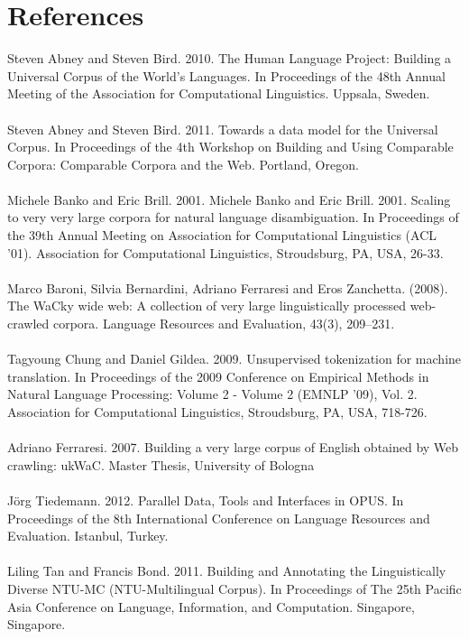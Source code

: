 \documentclass[11pt]{article}
\begin{document}
\section*{References}
Steven Abney and Steven Bird. 2010. The Human Language Project: Building a Universal Corpus of the World’s Languages. In Proceedings of the 48th Annual Meeting of the Association for Computational Linguistics. Uppsala, Sweden.
\\\\
Steven Abney and Steven Bird. 2011. Towards a data model for the Universal Corpus. In Proceedings of the 4th Workshop on Building and Using Comparable Corpora: Comparable Corpora and the Web. Portland, Oregon.
\\\\
Michele Banko and Eric Brill. 2001. Michele Banko and Eric Brill. 2001. Scaling to very very large corpora for natural language disambiguation. In Proceedings of the 39th Annual Meeting on Association for Computational Linguistics (ACL '01). Association for Computational Linguistics, Stroudsburg, PA, USA, 26-33.
\\\\
Marco Baroni, Silvia Bernardini, Adriano Ferraresi and Eros Zanchetta. (2008). The WaCky wide web: A collection of very large linguistically processed web-crawled corpora. Language Resources and Evaluation, 43(3), 209–231.
\\\\
Tagyoung Chung and Daniel Gildea. 2009. Unsupervised tokenization for machine translation. In Proceedings of the 2009 Conference on Empirical Methods in Natural Language Processing: Volume 2 - Volume 2 (EMNLP '09), Vol. 2. Association for Computational Linguistics, Stroudsburg, PA, USA, 718-726.
\\\\
Adriano Ferraresi. 2007. Building a very large corpus of English obtained by Web crawling: ukWaC. Master Thesis, University of Bologna
\\\\
Jörg Tiedemann. 2012. Parallel Data, Tools and Interfaces in OPUS. In Proceedings of the 8th International Conference on Language Resources and Evaluation. Istanbul, Turkey.
\\\\
Liling Tan and Francis Bond. 2011. Building and Annotating the Linguistically Diverse NTU-MC (NTU-Multilingual Corpus). In Proceedings of The 25th Pacific Asia Conference on Language, Information, and Computation. Singapore, Singapore.
\end{document}
